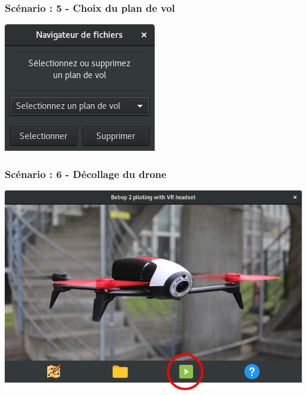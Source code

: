 \documentclass{beamer}
\begin{document}
	\begin{frame}
		\begin{center}
		\frametitle{Scénario : 5 - Choix du plan de vol}

        \includegraphics[scale=0.6]{selecteur-GUI.png}
		\end{center}
	\end{frame}
	
	
	


	\begin{frame}
		\begin{center}
		\frametitle{Scénario : 6 - Décollage du drone}

        \includegraphics[scale=0.4]{startFlight.png}
		\end{center}
	\end{frame}
	
\end{document}
